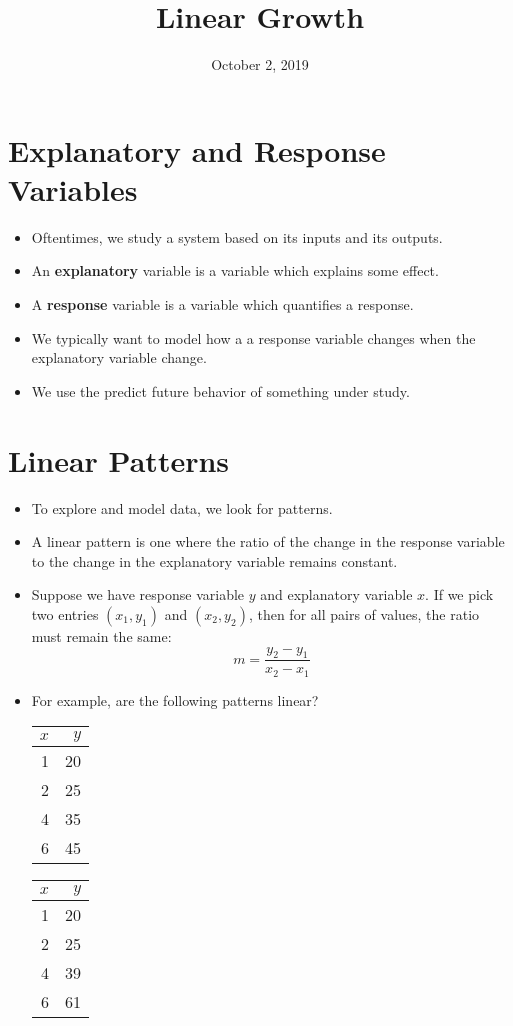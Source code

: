 \documentclass{article}
\title{Linear Growth}
\date{October 2, 2019}
\begin{document}
\maketitle
\section*{Explanatory and Response Variables}
\begin{itemize}
	\item Oftentimes, we study a system based on its inputs and its outputs.
	\item An {\bf explanatory} variable is a variable which explains some effect.
	\item A {\bf response} variable is a variable which quantifies a response.
	\item We typically want to model how a a response variable changes when the explanatory variable change.
	\item We use the predict future behavior of something under study.
\end{itemize}

\section*{Linear Patterns}
\begin{itemize}
	\item To explore and model data, we look for patterns.
	\item A linear pattern is one where the ratio of the change in the response variable to the change in the explanatory variable remains constant.
	\item Suppose we have response variable $y$ and explanatory variable $x$.  If we pick 
	two entries $(x_1, y_1)$ and $(x_2, y_2)$, then for all pairs of values, the ratio must remain the same:
	\[
	m = \dfrac{y_2 - y_1}{x_2-x_1}
	\]
	\item For example, are the following patterns linear?\newline
	\begin{tabular}{|r|r|}
		\hline
		$x$ & $y$ \\
		\hline
		1 & 20\\
		2 & 25\\
		4 & 35\\
		6 & 45\\
		\hline
	\end{tabular}
	\begin{tabular}{|r|r|}
		\hline
		$x$ & $y$ \\
		\hline
		1 & 20\\
		2 & 25\\
		4 & 39\\
		6 & 61\\
		\hline
	\end{tabular}
\end{itemize}
\end{document}
